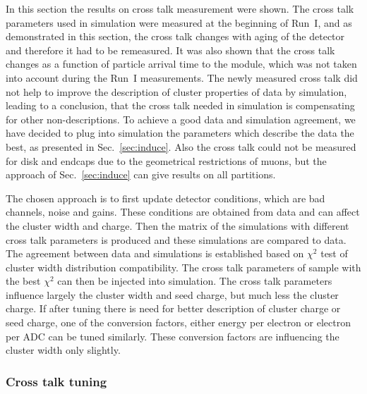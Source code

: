In this section the results on cross talk measurement were shown. The cross talk parameters used in simulation were measured at the beginning of Run~I, and as demonstrated in this section, the cross talk changes with aging of the detector and therefore it had to be remeasured. It was also shown that the cross talk changes as a function of particle arrival time to the module, which was not taken into account during the Run~I measurements. The newly measured cross talk did not help to improve the description of cluster properties of data by simulation, leading to a conclusion, that the cross talk needed in simulation is compensating for other non-descriptions. To achieve a good data and simulation agreement, we have decided to plug into simulation the parameters  which describe the data the best, as presented in Sec.~\ref{sec:induce}. Also the cross talk could not be measured for disk and endcaps due to the geometrical restrictions of muons, but the approach of Sec.~\ref{sec:induce} can give results on all partitions.

The chosen approach is to first update detector conditions, which are bad channels, noise and gains. These conditions are obtained from data and can affect the cluster width and charge. Then the matrix of the simulations with different cross talk parameters is produced and these simulations are compared to data. The agreement between data and simulations is established based on $\chi^{2}$ test of cluster width distribution compatibility. The cross talk parameters of sample with the best $\chi^{2}$ can then be injected into simulation. The cross talk parameters influence largely the cluster width and seed charge, but much less the cluster charge. If after tuning there is need for better description of cluster charge or seed charge, one of the conversion factors, either energy per electron or electron per ADC can be tuned similarly. These conversion factors are influencing the cluster width only slightly.



\subsubsection{Cross talk tuning}

